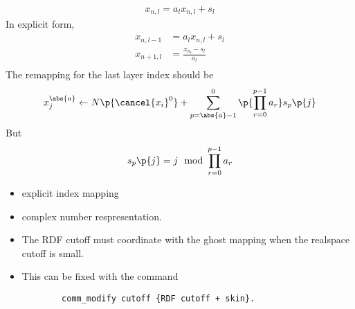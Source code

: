 \documentclass[11pt, a4paper]{article}
\begin{document}
\begin{equation}\begin{aligned}
    x_{n,l} = a_{l} x_{n,l} + s_{l}
\end{aligned}\end{equation}
In explicit form,
\begin{equation}\begin{aligned}
    x_{n,l-1} &= a_{l} x_{n, l} + s_{l} \\
    x_{n+1, l} &= \frac{x_{n_{l}} - s_{l}}{a_{l}} \\
\end{aligned}\end{equation}
The remapping for the last layer index should be
\begin{equation}\begin{aligned}
    x_{j}^{\abs{a}} \leftarrow N \p{\cancel{x_{i}}^{0}} + \sum_{p=\abs{a}-1}^{0} \p{\prod_{r=0}^{p-1} a_{r}} s_{p}\p{j}
\end{aligned}\end{equation}
But
\begin{equation}\begin{aligned}
    s_{p}\p{j} = j \mod \prod_{r=0}^{p-1} a_{r}
\end{aligned}\end{equation}

\begin{itemize}
    \item explicit index mapping
    \item complex number respresentation.
\end{itemize}

\begin{itemize}
    \item The RDF cutoff must coordinate with the ghost mapping when the realspace cutoff is small.
    \item This can be fixed with the command
    \begin{lstlisting}
        comm_modify cutoff {RDF cutoff + skin}.
    \end{lstlisting}
\end{itemize}




\end{document}
